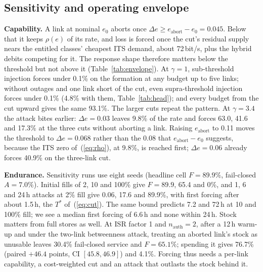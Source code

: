 \documentclass[conference,a4paper]{IEEEtran}
\begin{document}
\subsection{Sensitivity and operating envelope}\label{sec:sens}
\begin{table}[t]
\caption{Capability against budget: forced assurance loss $F$ (\%) after a 24\,h
attack from 2\% usable fill, outage-free, eight seeds; $\pm$ is the larger side of
the 95\% bootstrap interval. Complete suppression starts at $\Delta e=0.045$.}
\label{tab:envelope}
\centering\scriptsize
\setlength{\tabcolsep}{1.6pt}

\end{table}

\textbf{Capability.} A link at nominal $e_0$ aborts once $\Delta e\ge
e_{\mathrm{abort}}-e_0=0.045$. Below that it keeps $\rho(e)$ of its rate, and loss is
forced once the cut's residual supply nears the entitled classes' cheapest ITS demand,
about 72\,bit/s, plus the hybrid debits competing for it. The response shape
therefore matters below the threshold but not above it (Table~\ref{tab:envelope}). At
$\gamma=1$, sub-threshold injection forces under 0.1\% on the formation at any budget
up to five links; without outages and one link short of the cut, even
supra-threshold injection forces under 0.1\% (4.8\% with them, Table~\ref{tab:head});
and every budget from the cut upward gives the same 93.1\%. The larger cuts repeat the pattern. At $\gamma=3.4$ the attack bites earlier: $\Delta
e=0.03$ leaves 9.8\% of the rate and forces 63.0, 41.6 and 17.3\% at the three cuts
without aborting a link. Raising $e_{\mathrm{abort}}$ to 0.11 moves the threshold to
$\Delta e=0.068$ rather than the 0.08 that $e_{\mathrm{abort}}-e_0$ suggests, because
the ITS zero of~(\ref{eq:rho}), at 9.8\%, is reached first; $\Delta e=0.06$ already
forces 40.9\% on the three-link cut.

\textbf{Endurance.} Sensitivity runs use eight seeds (headline cell $F=89.9\%$,
fail-closed $A=7.0\%$). Initial fills of 2, 10 and 100\% give $F=89.9$, 65.4 and 0\%,
and 1, 6 and 24\,h attacks at 2\% fill give 0.06, 17.6 and 89.9\%, with first forcing
after about 1.5\,h, the $T^\ast$ of~(\ref{eq:cut}). The same bound predicts 7.2 and
72\,h at 10 and 100\% fill; we see a median first forcing of 6.6\,h and none within
24\,h. Stock matters from full stores as well. At ISR factor 1 and
$n_{\mathrm{auth}}=2$, after a 12\,h warm-up and under the two-link betweenness attack,
treating an aborted link's stock as unusable leaves 30.4\% fail-closed service and
$F=65.1\%$; spending it gives 76.7\% (paired $+46.4$ points, CI $[45.8,46.9]$) and
4.1\%. Forcing thus needs a per-link capability, a cost-weighted cut and an attack that outlasts the stock behind it.
\end{document}
